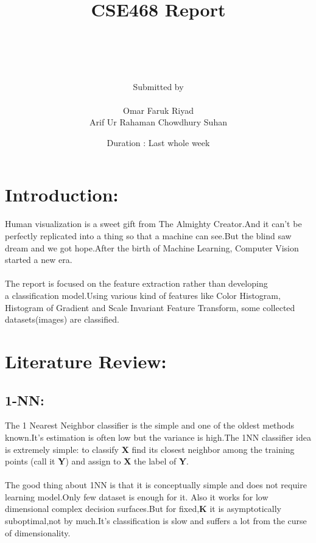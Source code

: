 \documentclass[12pt,a4paper] {article}
\author
	{	
		\\ \\ \\ \\ 
		Submitted by \\ \\
		Omar Faruk Riyad \\ 
		Arif Ur Rahaman Chowdhury Suhan
	}
\title
	{
		CSE468 Report
	}
\date{
		Duration : Last whole week
	}
\begin{document}
	\maketitle
	\pagebreak


	\section{Introduction:}
	Human visualization is a sweet gift from The Almighty Creator.And it can't be perfectly replicated 
	into a thing so that a machine can see.But the blind saw dream and we got hope.After the birth of Machine Learning, 
	Computer Vision started a new era.
	\\ \\
	The report is focused on the feature extraction rather than developing \\ a classification model.Using 
	various kind of features like Color Histogram, \\ Histogram of Gradient and Scale Invariant Feature Transform, 
	some collected datasets(images) are classified.
	
	
	\section{Literature Review:}

	\subsection{1-NN:}
	The 1 Nearest Neighbor classifier is the simple and one of the oldest methods known.It's 
	estimation is often low but the variance is high.The 1NN classifier idea is 
	extremely simple: to classify \textbf{X} find its closest neighbor among the training
	points (call it \textbf{Y}) and assign to \textbf{X} the label of \textbf{Y}. 
	\\ \\
	The good thing about 1NN is that it is conceptually simple and does not require learning model.Only 
	few dataset is enough for it. Also it works for low dimensional complex decision surfaces.But 
	for fixed,\textbf{K} it is asymptotically suboptimal,not by much.It's classification is slow and 
	suffers a lot from the curse of dimensionality.
\end{document}
